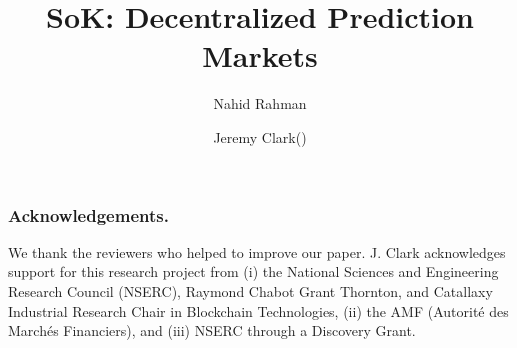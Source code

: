 \documentclass[runningheads]{llncs}
\begin{document}
\title{ SoK: Decentralized Prediction Markets}

\author{
	Nahid Rahman \and
	Jeremy Clark(\Letter)
	}


\maketitle









\subsubsection*{Acknowledgements.} We thank the reviewers who helped to improve our paper. J. Clark acknowledges support for this research project from (i) the National Sciences and Engineering Research Council (NSERC), Raymond Chabot Grant Thornton, and Catallaxy Industrial Research Chair in Blockchain Technologies, (ii) the AMF (Autorité des Marchés Financiers), and (iii) NSERC through a Discovery Grant. 





\clearpage
\appendix
\end{document}

